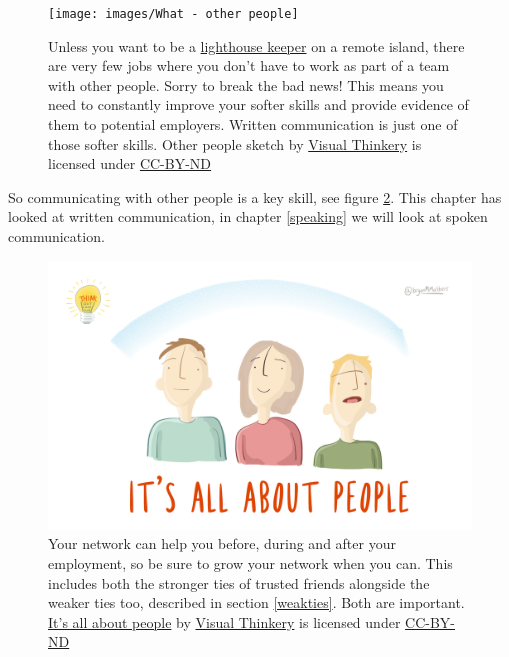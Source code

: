 \documentclass[
]{book}
\begin{document}
\begin{figure}

{\centering \texttt{[image: images/What - other people]} 

}

\caption{Unless you want to be a \href{https://en.wikipedia.org/wiki/Lighthouse_keeper}{lighthouse keeper} on a remote island, there are very few jobs where you don't have to work as part of a team with other people. Sorry to break the bad news! This means you need to constantly improve your softer skills and provide evidence of them to potential employers. Written communication is just one of those softer skills. Other people sketch by \href{https://visualthinkery.com}{Visual Thinkery} is licensed under \href{https://creativecommons.org/licenses/by-nd/4.0/}{CC-BY-ND}}\label{fig:otherpeople-fig}
\end{figure}



So communicating with other people is a key skill, see figure \ref{fig:allpeople-fig}. This chapter has looked at written communication, in chapter \ref{speaking} we will look at spoken communication.

\begin{figure}

{\centering \includegraphics[width=1\linewidth]{images/its-all-about-people-2} 

}

\caption{Your network can help you before, during and after your employment, so be sure to grow your network when you can. This includes both the stronger ties of trusted friends alongside the weaker ties too, described in section \ref{weakties}. Both are important. \href{https://bryanmmathers.com/its-all-about-people/}{It's all about people} by \href{https://visualthinkery.com/}{Visual Thinkery} is licensed under \href{https://creativecommons.org/licenses/by-nd/4.0/}{CC-BY-ND}}\label{fig:allpeople-fig}
\end{figure}
\end{document}
